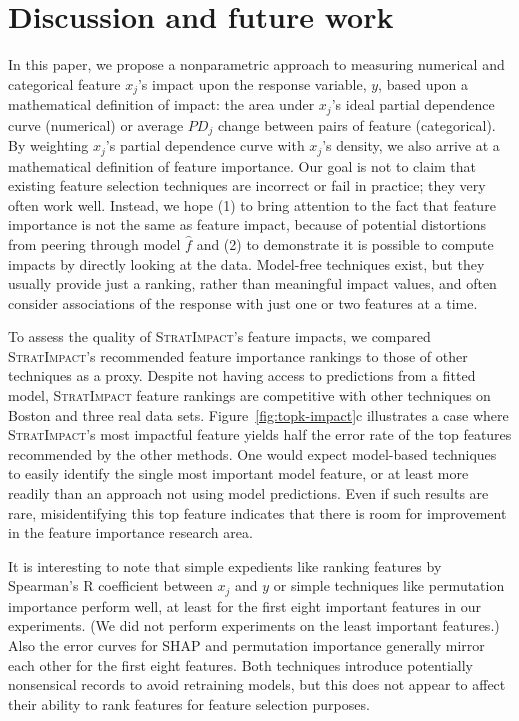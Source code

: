 \documentclass[11pt]{article}
\newcommand{\figref}[1]{Figure~\ref{#1}}
\newcommand{\simp}{\fontfamily{cmr}\textsc{\small StratImpact}}
\begin{document}
\section{Discussion and future work}\label{sec:discussion}

In this paper, we propose a nonparametric approach to measuring numerical and categorical feature $x_j$'s impact upon the response variable, $y$, based upon a mathematical definition of impact: the area under $x_j$'s ideal partial dependence curve (numerical) or average $PD_j$ change between pairs of feature (categorical). By weighting $x_j$'s  partial dependence curve with $x_j$'s density, we also arrive at a mathematical definition of feature importance.  Our goal is not to claim that existing feature selection techniques are incorrect or fail in practice; they very often work well. Instead, we hope (1) to bring attention to the fact that feature importance is not the same as feature impact, because of potential distortions from peering through model $\hat{f}$ and (2) to demonstrate it is possible to compute impacts by directly looking at the data.  Model-free techniques exist, but they usually provide just a ranking, rather than meaningful impact values, and often consider associations of the response with just one or two features at a time.

To assess the quality of \simp's feature impacts, we compared \simp's recommended feature importance rankings to those of other techniques as a proxy. Despite not having access to predictions from a fitted model, \simp{} feature rankings are competitive with other techniques on Boston and three real data sets.  \figref{fig:topk-impact}c illustrates a case where \simp's most impactful feature yields half the error rate of the top features recommended by the other methods.  One would expect model-based techniques to easily identify the single most important model feature, or at least more readily than an approach not using model predictions.  Even if such results are rare, misidentifying this top feature indicates that there is room for improvement in the feature importance research area. 

It is interesting to note that simple expedients like ranking features by Spearman's R coefficient between $x_j$ and $y$ or simple techniques like permutation importance perform well, at least for the first eight important features in our experiments. (We did not perform experiments on the least important features.) Also the error curves for SHAP and permutation importance generally mirror each other for the first eight features.  Both techniques introduce potentially nonsensical records to avoid retraining models, but this does not appear to affect their ability to rank features for feature selection purposes.
\end{document}
